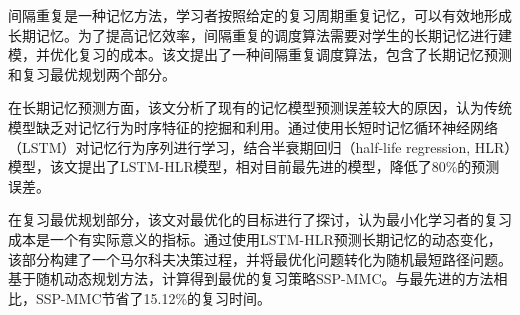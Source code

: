 \begin{cabstract}
间隔重复是一种记忆方法，学习者按照给定的复习周期重复记忆，可以有效地形成长期记忆。为了提高记忆效率，间隔重复的调度算法需要对学生的长期记忆进行建模，并优化复习的成本。该文提出了一种间隔重复调度算法，包含了长期记忆预测和复习最优规划两个部分。

在长期记忆预测方面，该文分析了现有的记忆模型预测误差较大的原因，认为传统模型缺乏对记忆行为时序特征的挖掘和利用。通过使用长短时记忆循环神经网络（LSTM）对记忆行为序列进行学习，结合半衰期回归（half-life regression, HLR）模型，该文提出了LSTM-HLR模型，相对目前最先进的模型，降低了80\%的预测误差。

在复习最优规划部分，该文对最优化的目标进行了探讨，认为最小化学习者的复习成本是一个有实际意义的指标。通过使用LSTM-HLR预测长期记忆的动态变化，该部分构建了一个马尔科夫决策过程，并将最优化问题转化为随机最短路径问题。基于随机动态规划方法，计算得到最优的复习策略SSP-MMC。与最先进的方法相比，SSP-MMC节省了15.12\%的复习时间。

\end{cabstract}

